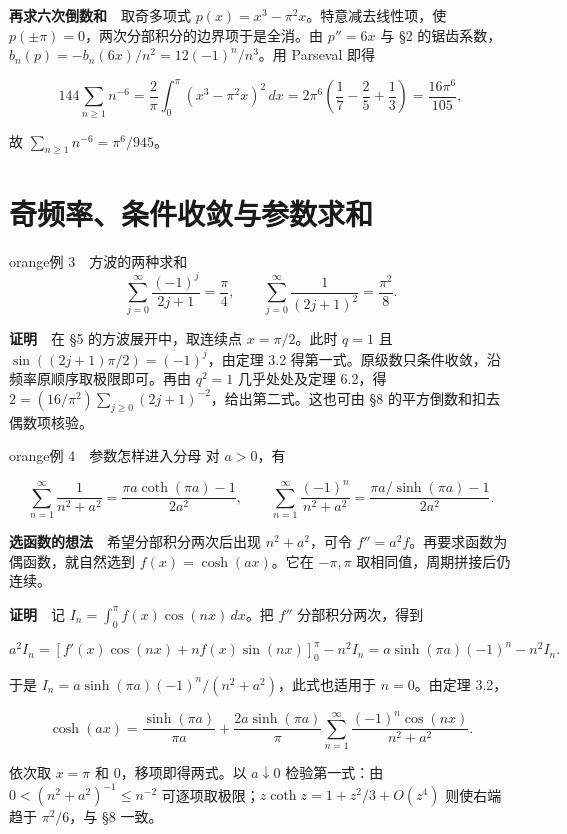 \documentclass[12pt,a4paper]{article}
\newcommand{\mysection}[1]{\clearpage\section{#1}}
\begin{document}
\textbf{再求六次倒数和}　取奇多项式 \(p(x)=x^3-\pi^2 x\)。特意减去线性项，使 \(p(\pm\pi)=0\)，两次分部积分的边界项于是全消。由 \(p''=6x\) 与 §2 的锯齿系数，\(b_n(p)=-b_n(6x)/n^2=12(-1)^n/n^3\)。用 Parseval 即得

\[
 144\sum_{n\ge1}n^{-6}
 =\frac2\pi\int_0^\pi(x^3-\pi^2x)^2\,dx
 =2\pi^6\left(\frac17-\frac25+\frac13\right)
 =\frac{16\pi^6}{105},
\]

故 \(\sum_{n\ge1}n^{-6}=\pi^6/945\)。

\mysection{奇频率、条件收敛与参数求和}




\begin{sboxenv}{orange}{例 3　方波的两种求和}
\[
\sum_{j=0}^\infty\frac{(-1)^j}{2j+1}=\frac\pi4,\qquad
\sum_{j=0}^\infty\frac1{(2j+1)^2}=\frac{\pi^2}{8}.
\]
\end{sboxenv}

\textbf{证明}　在 §5 的方波展开中，取连续点 \(x=\pi/2\)。此时 \(q=1\) 且 \(\sin((2j+1)\pi/2)=(-1)^j\)，由定理 3.2 得第一式。原级数只条件收敛，沿频率原顺序取极限即可。再由 \(q^2=1\) 几乎处处及定理 6.2，得 \(2=(16/\pi^2)\sum_{j\ge0}(2j+1)^{-2}\)，给出第二式。这也可由 §8 的平方倒数和扣去偶数项核验。

\begin{sboxenv}{orange}{例 4　参数怎样进入分母}
对 \(a>0\)，有

\[
\sum_{n=1}^\infty\frac1{n^2+a^2}
=\frac{\pi a\coth(\pi a)-1}{2a^2},\qquad
\sum_{n=1}^\infty\frac{(-1)^n}{n^2+a^2}
=\frac{\pi a/\sinh(\pi a)-1}{2a^2}.
\]
\end{sboxenv}

\textbf{选函数的想法}　希望分部积分两次后出现 \(n^2+a^2\)，可令 \(f''=a^2 f\)。再要求函数为偶函数，就自然选到 \(f(x)=\cosh(ax)\)。它在 \(-\pi,\pi\) 取相同值，周期拼接后仍连续。

\textbf{证明}　记 \(I_n=\int_0^\pi f(x)\cos(nx)\,dx\)。把 \(f''\) 分部积分两次，得到

\[
 a^2 I_n=[f'(x)\cos(nx)+n f(x)\sin(nx)]_0^\pi-n^2 I_n
 =a\sinh(\pi a)(-1)^n-n^2 I_n.
\]

于是 \(I_n=a\sinh(\pi a)(-1)^n/(n^2+a^2)\)，此式也适用于 \(n=0\)。由定理 3.2，

\[
 \cosh(ax)=\frac{\sinh(\pi a)}{\pi a}
 +\frac{2a\sinh(\pi a)}{\pi}
 \sum_{n=1}^{\infty}\frac{(-1)^n\cos(nx)}{n^2+a^2}.
\]

依次取 \(x=\pi\) 和 \(0\)，移项即得两式。以 \(a\downarrow0\) 检验第一式：由 \(0<(n^2+a^2)^{-1}\le n^{-2}\) 可逐项取极限；\(z\coth z=1+z^2/3+O(z^4)\) 则使右端趋于 \(\pi^2/6\)，与 §8 一致。
\end{document}
